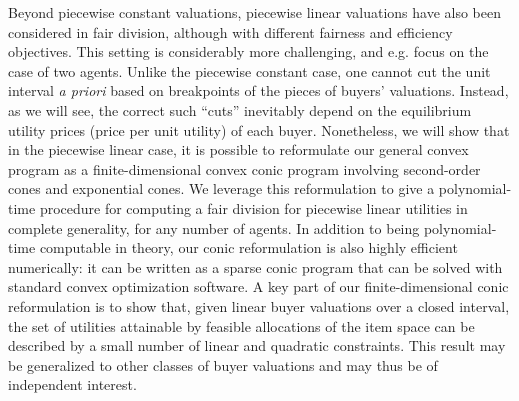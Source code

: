 Beyond piecewise constant valuations, piecewise linear valuations have also been considered in fair division, although with different fairness and efficiency objectives. This setting is considerably more challenging, and e.g. \citet[\S 4]{cohler2011optimal} focus on the case of two agents. Unlike the piecewise constant case, one cannot cut the unit interval \emph{a priori} based on breakpoints of the pieces of buyers' valuations. Instead, as we will see, the correct such ``cuts'' inevitably depend on the equilibrium utility prices (price per unit utility) of each buyer.
Nonetheless, we will show that in the piecewise linear case, it is possible to reformulate our general convex program as a finite-dimensional convex conic program involving second-order cones and exponential cones. 
We leverage this reformulation to give a polynomial-time procedure for computing a fair division for piecewise linear utilities in complete generality, for any number of agents.
In addition to being polynomial-time computable in theory, our conic reformulation is also highly efficient numerically: it can be written as a sparse conic program that can be solved with standard convex optimization software.
A key part of our finite-dimensional conic reformulation is to show that, given linear buyer valuations over a closed interval, the set of utilities attainable by feasible allocations of the item space can be described by a small number of linear and quadratic constraints. This result may be generalized to other classes of buyer valuations and may thus be of independent interest.



